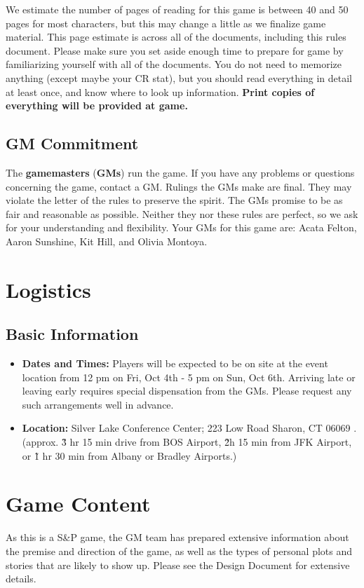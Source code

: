 \documentclass[sheet]{GL2020}
\begin{document}
We estimate the number of pages of reading for this game is between 40 and 50 pages for most characters, but this may change a little as we finalize game material. This page estimate is across all of the documents, including this rules document. Please make sure you set aside enough time to prepare for game by familiarizing yourself with all of the documents. You do not need to memorize anything (except maybe your CR stat), but you should read everything in detail at least once, and know where to look up information. \textbf{Print copies of everything will be provided at game.}

\subsection{GM Commitment}
The \textbf{gamemasters} (\textbf{GMs}) run the game. If you have any problems or questions concerning the game, contact a GM. Rulings the GMs make are final.  They may violate the letter of the rules to preserve the spirit.  The GMs promise to be as fair and reasonable as possible. Neither they nor these rules are perfect, so we ask for your understanding and flexibility. Your GMs for this game are: Acata Felton, Aaron Sunshine, Kit Hill, and Olivia Montoya.



\section{Logistics}
\subsection{Basic Information}
\begin{itemize}
  \item \textbf{Dates and Times:} Players will be expected to be on site at the event location from 12 pm on Fri, Oct 4th - 5 pm on Sun, Oct 6th. Arriving late or leaving early requires special dispensation from the GMs. Please request any such arrangements well in advance.
  \item \textbf{Location:} Silver Lake Conference Center; 223 Low Road Sharon, CT 06069 . (approx. \~3 hr 15 min drive from BOS Airport, \~2h 15 min from JFK Airport, or \~1 hr 30 min from Albany or Bradley Airports.)
\end{itemize}

\section{Game Content}
As this is a S\&P game, the GM team has prepared extensive information about the premise and direction of the game, as well as the types of personal plots and stories that are likely to show up. Please see the Design Document for extensive details.
\end{document}
